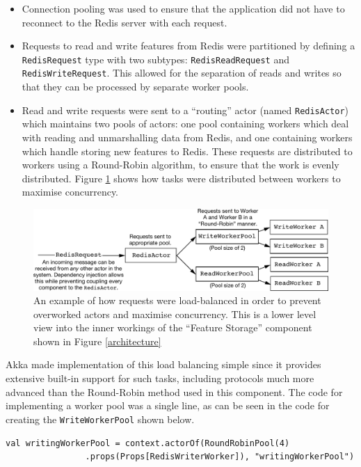 \documentclass{l4proj}
\newcommand{\code}[1]{\texttt{#1}}
\begin{document}
        \begin{itemize}
        \item Connection pooling was used to ensure that the application did not have to reconnect to the Redis server with each request.
        \item Requests to read and write features from Redis were partitioned by defining a \code{RedisRequest} type with two subtypes: \code{RedisReadRequest} and \code{RedisWriteRequest}. This allowed for the separation of reads and writes so that they can be processed by separate worker pools.
        \item Read and write requests were sent to a ``routing'' actor (named \code{RedisActor}) which maintains two pools of actors: one pool containing workers which deal with reading and unmarshalling data from Redis, and one containing workers which handle storing new features to Redis. These requests are distributed to workers using a Round-Robin algorithm, to ensure that the work is evenly distributed. Figure \ref{loadbalancing} shows how tasks were distributed between workers to maximise concurrency.
        \end{itemize}


\begin{figure}
\centering
\includegraphics[scale=0.7]{loadbalancing.pdf}
\caption{An example of how requests were load-balanced in order to prevent overworked actors and maximise concurrency. This is a lower level view into the inner workings of the ``Feature Storage'' component shown in Figure \ref{architecture}}
\label{loadbalancing}
\end{figure}
        
        Akka made implementation of this load balancing simple since it provides extensive built-in support for such tasks, including protocols much more advanced than the Round-Robin method used in this component. The code for implementing a worker pool was a single line, as can be seen in the code for creating the \code{WriteWorkerPool} shown below.
        
        \begin{lstlisting}[caption=Creating an actor pool to reduce the work required by any single actor.]
          val writingWorkerPool = context.actorOf(RoundRobinPool(4)
                .props(Props[RedisWriterWorker]), "writingWorkerPool")
        \end{lstlisting}
\end{document}
